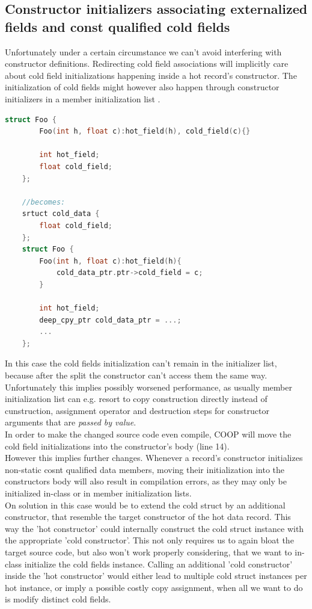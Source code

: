 \subsection{Constructor initializers associating externalized fields and const qualified cold fields}
Unfortunately under a certain circumstance we can't avoid interfering with constructor definitions. Redirecting cold field associations will implicitly care about cold field initializations happening inside a hot record's constructor. The initialization of cold fields might however also happen through constructor initializers in a member initialization list .
\begin{lstlisting}[language=C++, name={Simplified source transformations for problematic cold field initializations in initialization list.}, label={ctor_initializers}]
	struct Foo {
		Foo(int h, float c):hot_field(h), cold_field(c){}
	
		int hot_field;
		float cold_field;
	};
	
	//becomes:
	srtuct cold_data {
		float cold_field;
	};
	struct Foo {
		Foo(int h, float c):hot_field(h){
			cold_data_ptr.ptr->cold_field = c;
		}
	
		int hot_field;
		deep_cpy_ptr cold_data_ptr = ...;
		...
	};
\end{lstlisting}
In this case the cold fields initialization can't remain in the initializer list, because after the split the constructor can't access them the same way. Unfortunately this implies possibly worsened performance, as usually member initialization list can e.g. resort to copy construction directly instead of cunstruction, assignment operator and destruction steps for constructor arguments that are \textit{passed by value}.\\
In order to make the changed source code even compile, COOP will move the cold field initializations into the constructor's body (line 14).\\
However this implies further changes. Whenever a record's constructor initializes non-static cosnt qualified data members, moving their initialization into the constructors body will also result in compilation errors, as they may only be initialized in-class or in member initialization lists.\\
On solution in this case would be to extend the cold struct by an additional constructor, that resemble the target constructor of the hot data record. This way the 'hot constructor' could internally construct the cold struct instance with the appropriate 'cold constructor'. This not only requires us to again bloat the target source code, but also won't work properly considering, that we want to in-class initialize the cold fields instance. Calling an additional 'cold constructor' inside the 'hot constructor' would either lead to multiple cold struct instances per hot instance, or imply a possible costly copy assignment, when all we want to do is modify distinct cold fields.\\\\
